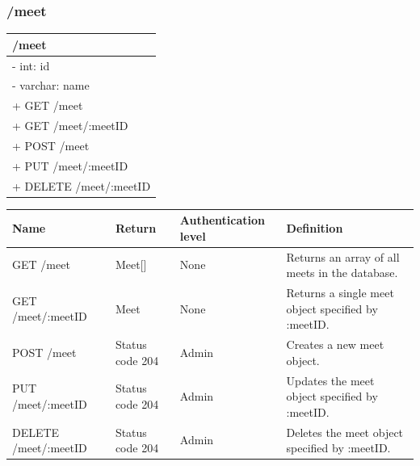 \documentclass[letterpaper,10pt,draftclsnofoot,onecolumn,]{article}
\begin{document}
\subsubsection{/meet}
\begin{center}
    \begin{tabular}{| p{20em} |}
        \hline
        \textbf{/meet} \\
        \hline
        - int: id \\
        - varchar: name \\
        \hline
        + GET /meet \\
        + GET /meet/:meetID \\
        + POST /meet \\
        + PUT /meet/:meetID \\
        + DELETE /meet/:meetID \\
        \hline
    \end{tabular}
\end{center}
\begin{center}
    \begin{tabular}{ | p{15em} | p{8em} | p{7em} | p{20em} | }
        \hline
        \textbf{Name} & \textbf{Return} & \textbf{Authentication level} & \textbf{Definition} \\
        \hline
        GET /meet & Meet[] & None & Returns an array of all meets in the database. \\
        \hline
        GET /meet/:meetID & Meet & None & Returns a single meet object specified by :meetID. \\
        \hline
        POST /meet & Status code 204 & Admin & Creates a new meet object. \\
        \hline
        PUT /meet/:meetID & Status code 204 & Admin & Updates the meet object specified by :meetID. \\
        \hline
        DELETE /meet/:meetID & Status code 204 & Admin & Deletes the meet object specified by :meetID. \\
        \hline
    \end{tabular}
\end{center}
\end{document}
